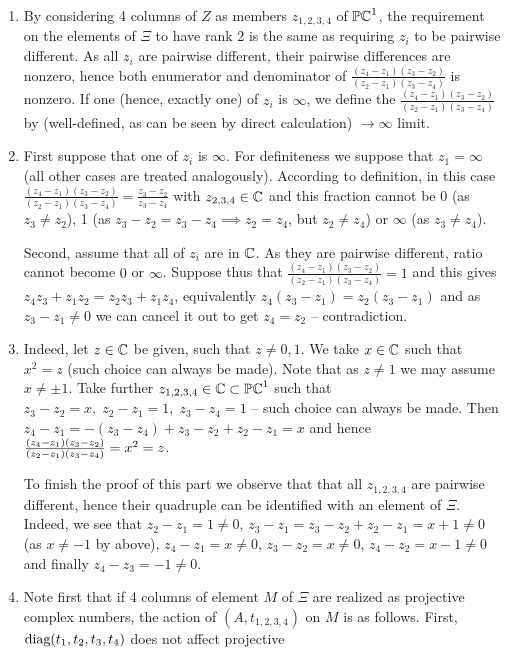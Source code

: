 \documentclass[8pt]{article} %
\newcommand{\diag}{\mbox{\normalfont{diag}}}
\begin{document}
\begin{enumerate}
	\item By considering 4 columns of $Z$ as members $z_{ 1,2,3,4 }$
		of $\mathbb{PC}^1$, the requirement on the elements of $\Xi$ to have rank
		2 is the same as requiring $z_i$ to be pairwise different. 
		As all $z_i$ are pairwise different, their pairwise differences are nonzero,
		hence both enumerator and denominator of $\frac{(z_4-z_1)(z_3-z_2)}{(z_2-z_1)(z_3-z_4)}$ is nonzero.
		If one (hence, exactly one) of $z_i$
		is $\infty$, we define the $\frac{(z_4-z_1)(z_3-z_2)}{(z_2-z_1)(z_3-z_4)}$ by (well-defined, as can
		be seen by direct calculation) $\to\infty$ limit. 
	\item First suppose that one of $z_i$ is $\infty$. For definiteness we suppose that $z_1=\infty$ (all other cases
		are treated analogously). According to definition, in this case $\frac{(z_4-z_1)(z_3-z_2)}{(z_2-z_1)(z_3-z_4)}=
		\frac{ z_3-z_2 }{ z_3-z_4 }$ with $z_{ 2,3,4 }\in\mathbb{C}$ and this fraction cannot be 0 (as $z_3\neq z_2$),
		1 (as $z_3-z_2=z_3-z_4\implies z_2=z_4$, but $z_2\neq z_4$) or $\infty$ (as $z_3\neq z_4$).\par
		Second, assume that all of $z_i$ are in $\mathbb{C}$. As they are pairwise different, ratio cannot become
		$0$ or $\infty$. Suppose thus that $\frac{(z_4-z_1)(z_3-z_2)}{(z_2-z_1)(z_3-z_4)}=1$ and this gives
		$z_4z_3+z_1z_2=z_2z_3+z_1z_4$, equivalently $z_4(z_3-z_1)=z_2(z_3-z_1)$ and as $z_3-z_1\neq0$ we can
		cancel it out to get $z_4=z_2$ -- contradiction.
	\item Indeed, let $z\in\mathbb{C}$ be given, such that $z\neq0,1$. We take $x\in\mathbb{C}$ such that $x^2=z$ (such choice can
		always be made). Note that as $z\neq1$ we may assume $x\neq\pm1$. Take further $z_{ 1,2,3,4 }\in\mathbb{C}\subset\mathbb{PC}^1$
		such that $z_3-z_2=x,\;z_2-z_1=1,\;z_3-z_4=1$ -- such choice can always be made. Then $z_4-z_1=
		-(z_3-z_4)+z_3-z_2+z_2-z_1=x$ and hence $\frac{(z_4-z_1)(z_3-z_2)}{(z_2-z_1)(z_3-z_4)}=x^2=z$.\par
		To finish the proof of this part we observe that that all $z_{ 1,2,3,4 }$ are pairwise different, hence their
		quadruple can be identified with an element of $\Xi$. Indeed, we see that $z_2-z_1=1\neq0$, $z_3-z_1=
		z_3-z_2+z_2-z_1=x+1\neq0$ (as $x\neq-1$ by above), $z_4-z_1=x\neq0$, $z_3-z_2=x\neq0$, $z_4-z_2=x-1\neq0$
		and finally $z_4-z_3=-1\neq0$.
	\item Note first that if 4 columns of element $M$ of $\Xi$ are realized as projective complex numbers, the action
		of $(A,t_{ 1,2,3,4})$ on $M$ is as follows. First, $\diag(t_1,t_2,t_3,t_4)$ does not affect projective

\end{enumerate}
\end{document}
